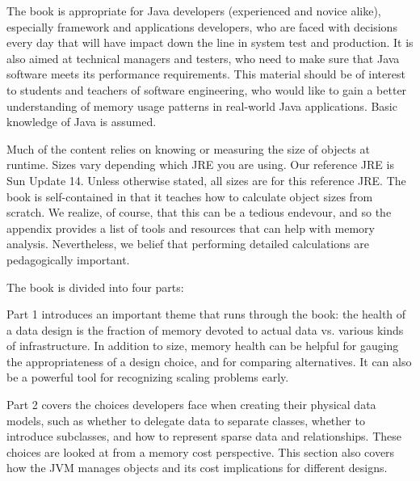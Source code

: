 
The book is appropriate for Java developers (experienced and novice alike), especially framework and applications developers, who are faced with decisions every day that will have impact down the line in system test and production. It is also aimed at technical managers and testers, who need to make sure that Java software meets its performance requirements.  This material should be of interest to students and teachers of software engineering, who would like to gain a better understanding of memory usage patterns in real-world Java applications. Basic knowledge of Java is assumed.

Much of the content relies on knowing or measuring the size of objects at
runtime. Sizes vary depending which JRE you are using. Our reference JRE is Sun
\javasix Update 14. Unless otherwise stated, all sizes are for this reference
JRE. The book is self-contained in that it teaches how to calculate object sizes from scratch. We realize, of course, that this can be a tedious endevour, and so the appendix provides a list of tools and resources that can help with memory analysis. Nevertheless, we belief that performing detailed calculations are pedagogically important.


The book is divided into four parts:

Part 1 introduces an important theme that runs through the book: the
health of a data design is the fraction of memory devoted to actual data vs. various kinds of infrastructure. In addition to size, memory health can be helpful for gauging the appropriateness of a design choice, and for comparing alternatives. It can also be a powerful tool for recognizing scaling problems early.

Part 2 covers the choices developers face when creating their physical data models, such as whether to delegate data to separate classes, whether to introduce subclasses, and how to represent sparse data and relationships. These choices are looked at from a memory cost perspective. This section also covers how the JVM manages objects and its cost implications for different designs.
  
